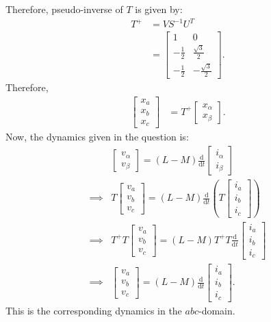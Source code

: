 Therefore, pseudo-inverse of $T$ is given by:
\begin{align*}
	T^+ &= VS^{-1}U^T\\
	&= \begin{bmatrix}
		1 & 0\\
		-\frac{1}{2} & \frac{\sqrt{3}}{2}\\
		-\frac{1}{2} & -\frac{\sqrt{3}}{2}
	\end{bmatrix}.
\end{align*}
Therefore,
\begin{align*}
	\begin{bmatrix}
		x_a\\x_b\\x_c
	\end{bmatrix} &= T^+ \begin{bmatrix}
		x_{\alpha}\\x_{\beta}
	\end{bmatrix}.
\end{align*}
Now, the dynamics given in the question is:
\begin{align*}
	&\begin{bmatrix}
		v_{\alpha}\\v_{\beta}
	\end{bmatrix} = (L-M)\frac{\text{d}}{\text{d}t}\begin{bmatrix}
		i_{\alpha}\\i_{\beta}
	\end{bmatrix}\\
	\implies & T\begin{bmatrix}
		v_a\\v_b\\v_c
	\end{bmatrix} = (L-M)\frac{\text{d}}{\text{d}t}\left(T\begin{bmatrix}
		i_a\\i_b\\i_c
	\end{bmatrix}\right)\\
	\implies & T^+T \begin{bmatrix}
		v_a\\v_b\\v_c
	\end{bmatrix} = (L-M)T^+T\frac{\text{d}}{\text{d}t}\begin{bmatrix}
		i_a\\i_b\\i_c
	\end{bmatrix}\\
	\implies & \begin{bmatrix}
		v_a\\v_b\\v_c
	\end{bmatrix} = (L-M)\frac{\text{d}}{\text{d}t}\begin{bmatrix}
	i_a\\i_b\\i_c
	\end{bmatrix}.
\end{align*}
This is the corresponding dynamics in the $abc$-domain.